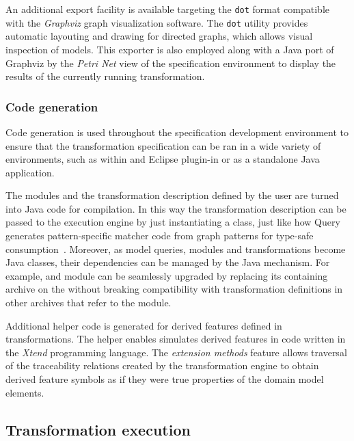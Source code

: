 An additional export facility is available targeting the \texttt{dot} format compatible with the \emph{Graphviz} graph visualization software. The \texttt{dot} utility provides automatic layouting and drawing for directed graphs, which allows visual inspection of  models. This exporter is also employed along with a Java port of Graphviz by the \emph{Petri Net} view of the specification environment to display the results of the currently running  transformation.

\subsubsection{Code generation}

Code generation is used throughout the specification development environment to ensure that the transformation specification can be ran in a wide variety of environments, such as within and Eclipse plugin-in or as a standalone Java application.

The  modules and the transformation description defined by the user are turned into Java code for compilation. In this way the transformation description can be passed to the execution engine by just instantiating a class, just like how  Query generates pattern-specific matcher code from graph patterns for type-safe consumption~\citep[Section~2.3]{Ujhelyi15incquery}. Moreover, as model queries,  modules and transformations become Java classes, their dependencies can be managed by the Java  mechanism. For example, and  module can be seamlessly upgraded by replacing its containing archive on the  without breaking compatibility with transformation definitions in other archives that refer to the module.

Additional helper code is generated for derived features defined in transformations. The helper enables simulates derived features in code written in the \emph{Xtend} programming language. The \emph{extension methods} feature allows traversal of the traceability relations created by the  transformation engine to obtain derived feature symbols as if they were true properties of the domain model elements.

\subsection{Transformation execution}

